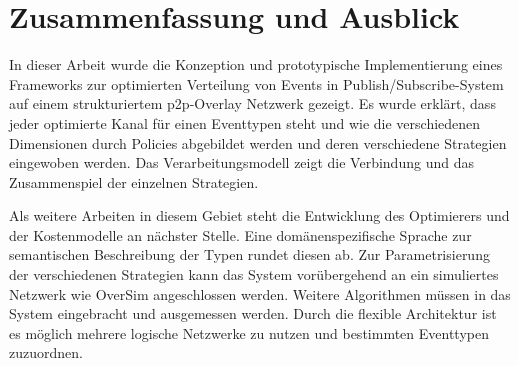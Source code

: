 \chapter{Zusammenfassung und Ausblick} 
\label{chap:zus}
In dieser Arbeit wurde die Konzeption und prototypische Implementierung eines Frameworks zur optimierten Verteilung von Events in Publish/Subscribe-System auf einem strukturiertem p2p-Overlay Netzwerk gezeigt. Es wurde erklärt, dass jeder optimierte Kanal für einen Eventtypen steht und wie die verschiedenen Dimensionen durch Policies abgebildet werden und deren verschiedene Strategien eingewoben werden. Das Verarbeitungsmodell zeigt die Verbindung und das Zusammenspiel der einzelnen Strategien.

Als weitere Arbeiten in diesem Gebiet steht die Entwicklung des Optimierers und der Kostenmodelle an nächster Stelle. Eine domänenspezifische Sprache zur semantischen Beschreibung der Typen rundet diesen ab. Zur Parametrisierung der verschiedenen Strategien kann das System vorübergehend an ein simuliertes Netzwerk wie OverSim \cite{Baumgart2007OverSim} angeschlossen werden. Weitere Algorithmen müssen in das System eingebracht und ausgemessen werden. Durch die flexible Architektur ist es möglich mehrere logische Netzwerke zu nutzen und bestimmten Eventtypen zuzuordnen.

